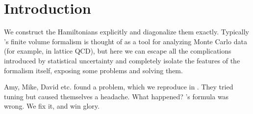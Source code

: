 \section{Introduction}\label{sec:intro}


We construct the Hamiltonians explicitly and diagonalize them exactly.
Typically \Luscher's finite volume formalism is thought of as a tool for analyzing Monte Carlo data (for example, in lattice QCD), but here we can escape all the complications introduced by statistical uncertainty and completely isolate the features of the formalism itself, exposing some problems and solving them.


Amy, Mike, David etc. found a problem, which we reproduce in .  They tried tuning but caused themselves a headache.  What happened?  \Luscher's formula was wrong.  We fix it, and win glory.
